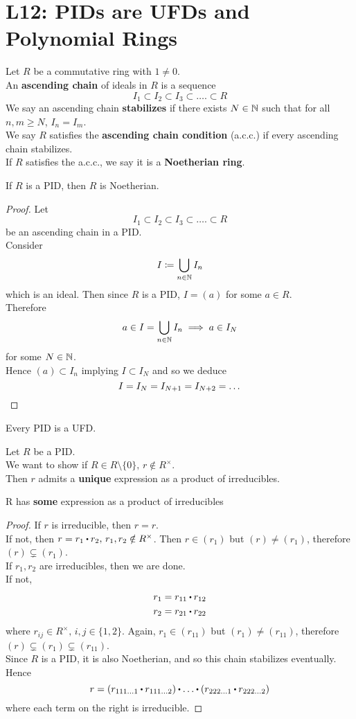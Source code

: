 \documentclass[../Main.tex]{subfiles}
\begin{document}
\chapter{L12: PIDs are UFDs and Polynomial Rings}
\begin{dfn}[title = {Ascending Chains, Noetherian Ring}]
	Let $R$ be a commutative ring with $1\ne 0$.\\
	An \textbf{ascending chain} of ideals in $R$ is a sequence
	\[I_1\subset I_2\subset I_3\subset\dots.\subset R\]
	We say an ascending chain \textbf{stabilizes} if there exists $N\in \mathbb{N}$ such that for all $n,m \ge N$, $I_n=I_m$.\\
	We say $R$ satisfies the \textbf{ascending chain condition} (a.c.c.) if every ascending chain stabilizes.\\
	If $R$ satisfies the a.c.c., we say it is a \textbf{Noetherian ring}.
\end{dfn}
\begin{thm}[title = PID is Noetherian]
	If $R$ is a PID, then $R$ is Noetherian.
\end{thm}
\begin{proof}
	Let
	\[I_1\subset I_2\subset I_3\subset\dots.\subset R\]
	be an ascending chain in a PID.\\
	Consider
	\[I\coloneqq \bigcup\limits_{n\in \mathbb{N}} I_n\]
	which is an ideal. Then since $R$ is a PID, $I=(a)$ for some $a\in R$.\\
	Therefore
	\[a\in I =\bigcup\limits_{n\in \mathbb{N}} I_n\implies a\in I_N \]
	for some $N\in \mathbb{N}$.\\
	Hence $(a)\subset I_n$ implying $I\subset I_N$ and so we deduce
	\[I=I_N=I_{N+1}=I_{N+2}=\dots\qedhere\]
\end{proof}
\begin{thm}[title = PID IS UFD]
	Every PID is a UFD.
\end{thm}
Let $R$ be a PID.\\
We want to show if $R\in R\setminus \{0\},\, r\notin R^\times$.\\
Then $r$ admits a \textbf{unique} expression as a product of irreducibles.
\newpage
\begin{lem}
	R has \textbf{some} expression as a product of irreducibles
\end{lem}
\begin{proof}
	If $r$ is irreducible, then $r=r$.\\
	If not, then $r=r_1\rdot r_2,\, r_1,r_2\notin R^\times$. Then $r\in (r_1)$ but $(r)\ne (r_1)$, therefore $(r)\subsetneq (r_1)$.\\
	If $r_1,r_2$ are irreducibles, then we are done.\\
	If not, 
	\begin{align*}
	r_1=r_{11}\rdot r_{12}\\
	r_2=r_{21}\rdot r_{22}
	\end{align*}
	where $r_{ij}\in R^\times,\, i,j\in \{1,2\}$. Again, $r_1\in (r_{11})$ but $(r_1)\ne (r_{11})$, therefore $(r)\subsetneq (r_1)\subsetneq (r_{11})$.\\
	Since $R$ is a PID, it is also Noetherian, and so this chain stabilizes eventually. Hence
	\[r=(r_{111\dots1}\rdot r_{111\dots 2})\rdot \dots \rdot (r_{222\dots1}\rdot r_{222\dots 2})\]
	where each term on the right is irreducible.
\end{proof}
\end{document}
